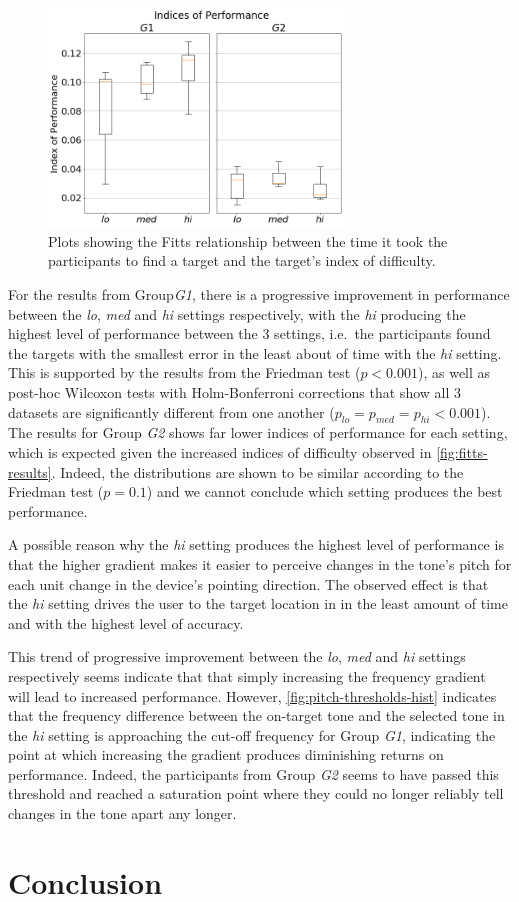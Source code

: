 \documentclass{article}
\begin{document}
\begin{figure}
  \centering
  \includegraphics[width=0.7\textwidth]{figures/fitts_ips.png}
  \caption{Plots showing the Fitts relationship between the time it took the participants to find a target and the target's index of difficulty. }\label{fig:fitts-ips}
\end{figure}

For the results from Group\textit{G1}, there is a progressive improvement in performance between the \textit{lo}, \textit{med} and \textit{hi} settings respectively, with the \textit{hi} producing the highest level of performance between the 3 settings, i.e.\ the participants found the targets with the smallest error in the least about of time with the \textit{hi} setting.
This is supported by the results from the Friedman test ($p < 0.001$), as well as post-hoc Wilcoxon tests with Holm-Bonferroni corrections that show all 3 datasets are significantly different from one another ($p_{lo} = p_{med} = p_{hi} < 0.001$).
The results for Group \textit{G2} shows far lower indices of performance for each setting, which is expected given the increased indices of difficulty observed in \cref{fig:fitts-results}.
Indeed, the distributions are shown to be similar according to the Friedman test ($p = 0.1$) and we cannot conclude which setting produces the best performance. 

A possible reason why the \textit{hi} setting produces the highest level of performance is that the higher gradient makes it easier to perceive changes in the tone's pitch for each unit change in the device's pointing direction.
The observed effect is that the \textit{hi} setting drives the user to the target location in in the least amount of time and with the highest level of accuracy. 

This trend of progressive improvement between the \textit{lo}, \textit{med} and \textit{hi} settings respectively seems indicate that that simply increasing the frequency gradient will lead to increased performance.
However, \cref{fig:pitch-thresholds-hist} indicates that the frequency difference between the on-target tone and the selected tone in the \textit{hi} setting is approaching the cut-off frequency for Group \textit{G1}, indicating the point at which increasing the gradient produces diminishing returns on performance. 
Indeed, the participants from Group \textit{G2} seems to have passed this threshold and reached a saturation point where they could no longer reliably tell changes in the tone apart any longer. 

\section{Conclusion}\label{sec:conclusion}



\end{document}
